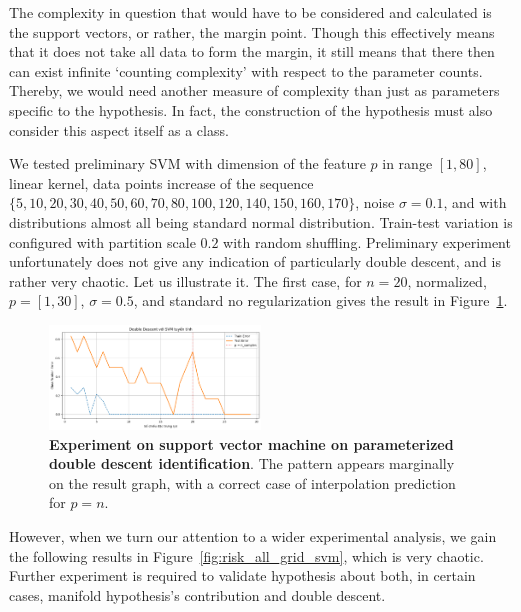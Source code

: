 \documentclass[twoside,10pt]{article}
\begin{document}
The complexity in question that would have to be considered and calculated is the support vectors, or rather, the margin point. Though this effectively means that it does not take all data to form the margin, it still means that there then can exist infinite `counting complexity' with respect to the parameter counts. Thereby, we would need another measure of complexity than just as parameters specific to the hypothesis. In fact, the construction of the hypothesis must also consider this aspect itself as a class. 

We tested preliminary SVM with dimension of the feature $p$ in range $[1,80]$, linear kernel, data points increase of the sequence $\{5, 10, 20, 30, 40 , 50, 60, 70 , 80, 100, 120, 140, 150, 160, 170\}$, noise $\sigma = 0.1$, and with distributions almost all being standard normal distribution. Train-test variation is configured with partition scale $0.2$ with random shuffling. Preliminary experiment unfortunately does not give any indication of particularly double descent, and is rather very chaotic. Let us illustrate it. The first case, for $n=20$, normalized, $p=[1,30]$, $\sigma =0.5$, and standard no regularization gives the result in Figure~\ref{fig:test_svm_com_ideal}.

\begin{figure}[htb]
  \centering
  \includegraphics[width=0.5\textwidth]{test_case_ideal_svm.png}
  \caption{\textbf{Experiment on support vector machine on parameterized double descent identification}. The pattern appears marginally on the result graph, with a correct case of interpolation prediction for $p=n$.}
  \label{fig:test_svm_com_ideal}
\end{figure}
However, when we turn our attention to a wider experimental analysis, we gain the following results in Figure~\ref{fig:risk_all_grid_svm}, which is very chaotic. Further experiment is required to validate hypothesis about both, in certain cases, manifold hypothesis's contribution and double descent. 
\end{document}
